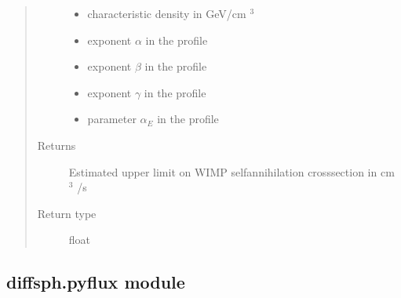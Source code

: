 \documentclass[letterpaper,10pt,english]{sphinxmanual}
\begin{document}
\begin{fulllineitems}
\begin{quote}
\begin{description}
\begin{itemize}
\item {} 
\sphinxAtStartPar
{} \textendash{} characteristic density in GeV/cm \({}^3\)

\item {} 
\sphinxAtStartPar
{} \textendash{} exponent \(\alpha\) in the {\hyperref[\detokenize{diffsph.profiles:diffsph.profiles.templates.hdz}]{}} profile

\item {} 
\sphinxAtStartPar
{} \textendash{} exponent \(\beta\) in the {\hyperref[\detokenize{diffsph.profiles:diffsph.profiles.templates.hdz}]{}} profile

\item {} 
\sphinxAtStartPar
{} \textendash{} exponent \(\gamma\) in the {\hyperref[\detokenize{diffsph.profiles:diffsph.profiles.templates.hdz}]{}} profile

\item {} 
\sphinxAtStartPar
{} \textendash{} parameter \(\alpha_E\) in the {\hyperref[\detokenize{diffsph.profiles:diffsph.profiles.templates.enst}]{}} profile

\end{itemize}

\item[{Returns}] \leavevmode
\sphinxAtStartPar
Estimated upper limit on WIMP self\sphinxhyphen{}annihilation cross\sphinxhyphen{}section in cm \({}^3\) /s

\item[{Return type}] \leavevmode
\sphinxAtStartPar
float

\end{description}\end{quote}

\end{fulllineitems}



\subsection{diffsph.pyflux module}
\label{\detokenize{diffsph:module-diffsph.pyflux}}\label{\detokenize{diffsph:diffsph-pyflux-module}}
\end{document}
